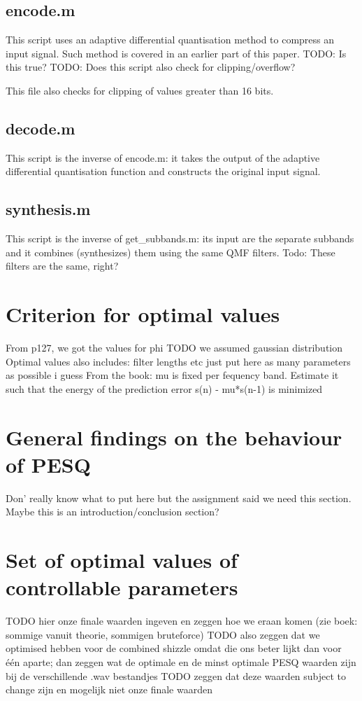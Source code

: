 \documentclass[a4paper]{article}
\begin{document}
\subsection{encode.m}
This script uses an adaptive differential quantisation method to compress an input signal. Such method is covered in an earlier part of this paper. TODO: Is this true?
TODO: Does this script also check for clipping/overflow?

This file also checks for clipping of values greater than 16 bits.

\subsection{decode.m}
This script is the inverse of encode.m: it takes the output of the adaptive differential quantisation function and constructs the original input signal.

\subsection{synthesis.m}
This script is the inverse of get\_subbands.m: its input are the separate subbands and it combines (synthesizes) them using the same QMF filters. Todo: These filters are the same, right?

\section{Criterion for optimal values}
From p127, we got the values for phi TODO we assumed gaussian distribution
Optimal values also includes: filter lengths etc just put here as many parameters as possible i guess
From the book: mu is fixed per fequency band. Estimate it such that the energy of the prediction error s(n) - mu*s(n-1) is minimized

\section{General findings on the behaviour of PESQ}
Don' really know what to put here but the assignment said we need this section. Maybe this is an introduction/conclusion section?

\section{Set of optimal values of controllable parameters}
TODO hier onze finale waarden ingeven en zeggen hoe we eraan komen (zie boek: sommige vanuit theorie, sommigen bruteforce)
TODO also zeggen dat we optimised hebben voor de combined shizzle omdat die ons beter lijkt dan voor één aparte; dan zeggen wat de optimale en de minst optimale PESQ waarden zijn bij de verschillende .wav bestandjes
TODO zeggen dat deze waarden subject to change zijn en mogelijk niet onze finale waarden
\end{document}
